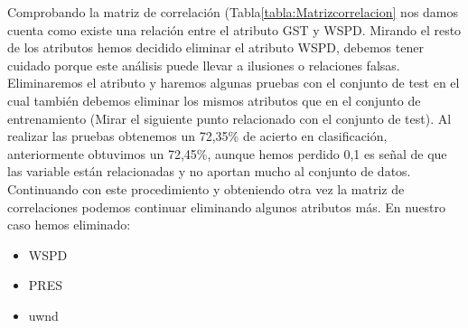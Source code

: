 \begin{table}[H]
	\caption{Matriz de correlación}
	\label{tabla:Matrizcorrelacion}
\end{table}

Comprobando la matriz de correlación (Tabla\ref{tabla:Matrizcorrelacion} nos damos cuenta como existe una relación entre el atributo GST y WSPD. Mirando el resto de los atributos hemos decidido eliminar el atributo WSPD, debemos tener cuidado porque este análisis puede llevar a ilusiones o relaciones falsas. Eliminaremos el atributo y haremos algunas pruebas con el conjunto de test en el cual también debemos eliminar los mismos atributos que en el conjunto de entrenamiento (Mirar el siguiente punto relacionado con el conjunto de test). Al realizar las pruebas obtenemos un 72,35\% de acierto en clasificación, anteriormente obtuvimos un 72,45\%, aunque hemos perdido 0,1 es señal de que las variable están relacionadas y no aportan mucho al conjunto de datos. Continuando con este procedimiento y obteniendo otra vez la matriz de correlaciones podemos continuar eliminando algunos atributos más. En nuestro caso hemos eliminado: 
\begin{itemize}
	\item WSPD
	\item PRES
	\item uwnd
\end{itemize} 

